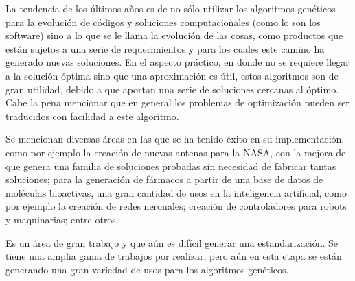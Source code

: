 \documentclass{article}
\begin{document}
La tendencia de los últimos años es de no sólo utilizar los algoritmos genéticos para la evolución de códigos y soluciones computacionales (como lo son los software) sino a lo que se le llama la evolución de las cosas, como productos que están sujetos a una serie de requerimientos y para los cuales este camino ha generado nuevas soluciones. En el aspecto práctico, en donde no se requiere llegar a la solución óptima sino que una aproximación es útil, estos algoritmos son de gran utilidad, debido a que aportan una serie de soluciones cercanas al óptimo. Cabe la pena mencionar que en general los problemas de optimización pueden ser traducidos con facilidad a este algoritmo. 

Se mencionan diversas áreas en las que se ha tenido éxito en su implementación, como por ejemplo la creación de nuevas antenas para la NASA, con la mejora de que genera una familia de soluciones probadas sin necesidad de fabricar tantas soluciones; para la generación de fármacos a partir de una base de datos de moléculas bioactivas, una gran cantidad de usos en la inteligencia artificial, como por ejemplo la creación de redes neronales; creación de controladores para robots y maquinarias; entre otros.

Es un área de gran trabajo y que aún es difícil generar una estandarización. Se tiene una amplia gama de trabajos por realizar, pero aún en esta etapa se están generando una gran variedad de usos para los algoritmos genéticos. 



\end{document}
